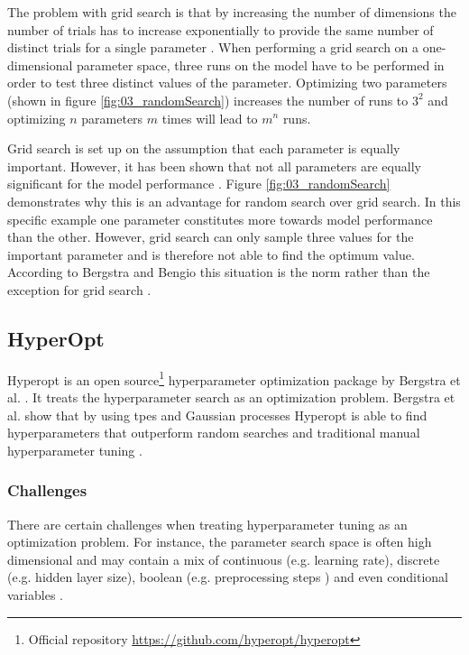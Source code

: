 The problem with grid search is that by increasing the number of dimensions the number of trials has to increase exponentially to provide the same number of distinct trials for a single parameter \cite{Bergstra2012a}. When performing a grid search on a one-dimensional parameter space, three runs on the model have to be performed in order to test three distinct values of the parameter. Optimizing two parameters {(shown in figure \ref{fig:03_randomSearch})} increases the number of runs to $3^2$ and optimizing $n$ parameters $m$ times will lead to $m^n$ runs. 

Grid search is set up on the assumption that each parameter is equally important. However, it has been shown that not all parameters are equally significant for the model performance \cite{Bergstra2012a}. Figure \ref{fig:03_randomSearch} demonstrates why this is an advantage for random search over grid search. In this specific example one parameter constitutes more towards model performance than the other. However, grid search can only sample three values for the important parameter and is therefore not able to find the optimum value. According to Bergstra and Bengio this situation is the norm rather than the exception for grid search \cite{Bergstra2012a}.

\subsection{HyperOpt}

Hyperopt is an open source\footnote{Official repository \url{https://github.com/hyperopt/hyperopt}} hyperparameter optimization package by Bergstra et al. \cite{Bergstra2013a}. It treats the hyperparameter search as an optimization problem. Bergstra et al. show that by using \glspl{tpe} and Gaussian processes Hyperopt is able to find hyperparameters that outperform random searches and traditional manual hyperparameter tuning \cite{Bergstra2011}.




\subsubsection*{Challenges}

There are certain challenges when treating hyperparameter tuning as an optimization problem. For instance, the parameter search space is often high dimensional and may contain a mix of continuous {(e.g. learning rate)}, discrete {(e.g. hidden layer size)}, boolean {(e.g. preprocessing steps \cite{Hutter2009})} and even conditional variables \cite{Bergstra2013}. 


